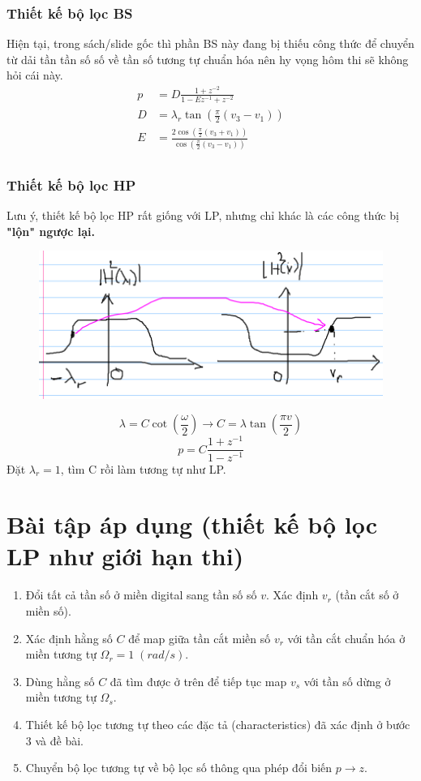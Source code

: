 \documentclass{article}
\begin{document}
\subsubsection{Thiết kế bộ lọc BS}
Hiện tại, trong sách/slide gốc thì phần BS này đang bị thiếu công thức để chuyển từ dải tần tần số số về tần số tương tự chuẩn hóa nên hy vọng hôm thi sẽ không
hỏi cái này.
\begin{equation*}
  \begin{split}
  p&=D\frac{1+z^{-2}}{1-Ez^{-1}+z^{-2}}\\
  D&=\lambda_{r}\tan{\left(\frac{\pi}{2}(v_{3}-v_{1})\right)}\\
  E&=\frac{2\cos{\left(\frac{\pi}{2}(v_{3}+v_{1})\right)}}{\cos{\left(\frac{\pi}{2}(v_{3}-v_{1})\right)}}\\
    \end{split}
\end{equation*}
\subsubsection{Thiết kế bộ lọc HP}
Lưu ý, thiết kế bộ lọc HP rất giống với LP, nhưng chỉ khác là các công thức bị \textbf{"lộn" ngược lại.}
\begin{figure}[H]
  \begin{center}
  \includegraphics[width=13cm]{30.png}
  \end{center}
  \end{figure}
  $$\lambda=C\cot{\left(\frac{\omega}{2}\right)} \to C=\lambda \tan{\left(\frac{\pi v}{2}\right)}$$
  $$p=C\frac{1+z^{-1}}{1-z^{-1}}$$
Đặt $\lambda_{r}=1$, tìm C rồi làm tương tự như LP.
\section{Bài tập áp dụng (thiết kế bộ lọc LP như giới hạn thi)}
\begin{enumerate}
  \item Đổi tất cả tần số ở miền digital sang tần số số $v$. Xác định $v_{r}$ (tần cắt số ở miền số).
  \item Xác định hằng số $C$ để map giữa tần cắt miền số $v_{r}$ với tần cắt chuẩn hóa ở miền tương tự $\Omega_{r}=1\; (rad/s)$.
  \item Dùng hằng số $C$ đã tìm được ở trên để tiếp tục map $v_{s}$ với tần số dừng ở miền tương tự $\Omega_{s}$.
  \item Thiết kế bộ lọc tương tự theo các đặc tả (characteristics) đã xác định ở bước $3$ và đề bài.
  \item Chuyển bộ lọc tương tự về bộ lọc số thông qua phép đổi biến $p\to z$.
\end{enumerate}
\end{document}
